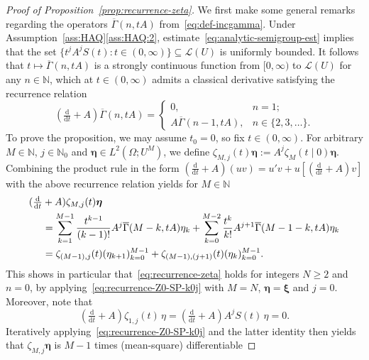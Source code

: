 \documentclass[10pt,a4paper]{amsart}
\newcommand{\N}{\mathbb{N}}
\begin{document}
\begin{proof}[Proof of Proposition~\ref{prop:recurrence-zeta}]
	We first make some general remarks regarding the operators $\overline\Gamma(n, tA)$
	from~\eqref{eq:def-incgamma}.
	Under Assumption~\ref{ass:HAQ}\ref{ass:HAQ:2},
	estimate~\eqref{eq:analytic-semigroup-est} implies that
	the set $\{t^j A^jS(t) : t \in (0,\infty)\} \subseteq \mathscr{L}(U)$ is uniformly bounded.
	It follows that
	$t \mapsto \overline\Gamma(n, tA)$ 
	is a strongly continuous
	function from $[0,\infty)$ to $\mathscr{L}(U)$ for any $n \in \N$,
	which at $t \in (0,\infty)$ admits a classical derivative
	satisfying the recurrence relation
	\begin{equation}\label{eq:recurrence-incompletegamma}
		\left(\tfrac{\mathrm d}{\mathrm d t} + A\right)\overline{\Gamma}(n, tA) 
		= 
		\begin{cases}
			0, &n = 1; \\
			A\overline{\Gamma}(n-1, tA), &n \in \{2,3,\dots\}.
		\end{cases}
	\end{equation} 
	To prove the proposition, we may assume $t_0 = 0$, so fix $t \in (0,\infty)$.
	For arbitrary $M \in \N$, $j \in \N_0$ and $\bm\eta \in L^2(\Omega; U^{M})$, we define
	$
	\zeta_{M,j}(t) \bm\eta
	:= 
	A^j \zeta_{M}(t \mid 0) \bm\eta.
	$
	Combining the product rule in the form 
	$(\frac{\mathrm d}{\mathrm dt} + A)(uv) = u'v + u[(\frac{\mathrm d}{\mathrm dt} + A)v]$
	with the above recurrence relation yields for $M \in \N$
	\begin{align}
		(\tfrac{\mathrm d}{\mathrm dt} &+ A)\zeta_{M,j}(t) \bm \eta
		\\&=
		\sum_{k=1}^{M-1} \frac{t^{k-1}}{(k-1)!} A^j \overline\Gamma(M-k, tA) \eta_k
		+
		\sum_{k=0}^{M-2} \frac{t^k}{k!} A^{j+1} \overline\Gamma(M-1-k, tA) \eta_k
		\notag
		\\
		&=
		\zeta_{(M-1),j}(t) (\eta_{k+1})_{k=0}^{M-1} + \zeta_{(M-1),(j+1)}(t) (\eta_{k})_{k=0}^{M-1}
		\label{eq:recurrence-Z0-SP-k0j}.
	\end{align}
	This shows in particular that~\eqref{eq:recurrence-zeta}
	holds for integers $N \ge 2$ and $n = 0$, 
	by applying~\eqref{eq:recurrence-Z0-SP-k0j} with $M = N$, $\bm\eta = \bm\xi$ and $j = 0$.
	Moreover, note that
	\[
	\left(\tfrac{\mathrm d}{\mathrm dt} + A\right) \zeta_{1,j}(t) \, \eta 
	=
	\left(\tfrac{\mathrm d}{\mathrm dt} + A\right) A^j S(t) \, \eta
	=
	0.
	\]
	Iteratively applying~\eqref{eq:recurrence-Z0-SP-k0j} and the latter identity then
	yields that $\zeta_{M,j}\bm\eta$ is $M-1$ times (mean-square) differentiable

\end{proof}
\end{document}
